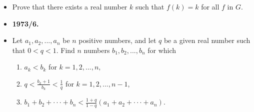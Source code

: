 \documentclass[a4paper,12pt]{article}
\begin{document}
\begin{itemize}[label={},leftmargin=0pt]
\begin{enumerate}[label=(\alph*)]
	\item If $f$ is in $G$, then its inverse $f^{-1}$ is in $G$; here the inverse of $f(x) = ax+b$ is $f^{-1}(x) = (x - b)/a$.
	\item For every $f$ in $G$, there exists a real number $x_f$ such that $f(x_f ) = x_f$ .
\end{enumerate}
	\item Prove that there exists a real number $k$ such that $f(k) = k$ for all $f$ in $G$.
\item \textbf{\large 1973/6.}
\item Let $a_1, a_2, ..., a_n$ be $n$ positive numbers, and let $q$ be a given real number such that $0 < q < 1$. Find $n$ numbers $b_1, b_2, ..., b_n$ for which
\begin{enumerate}[label=(\alph*)]
	\item $a_k < b_k$ for $k = 1, 2, ... , n,$
	\item $q < \frac{b_k+1}{b_k} < \frac{1}{q}$ for $k = 1, 2, ..., n - 1$,
	\item $b_1 + b_2 + \cdot \cdot \cdot + b_n < \frac{1+q}{1-q}(a_1 + a_2 + \cdot \cdot \cdot + a_n).$
\end{enumerate}
\end{itemize}
\end{document}
